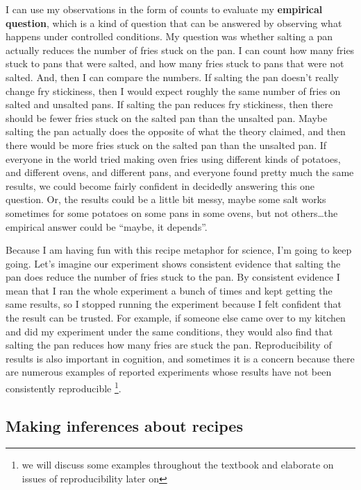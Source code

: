 \documentclass[
  oneside,
  12pt]{crumpbook}
\begin{document}
I can use my observations in the form of counts to evaluate my \textbf{empirical question}, which is a kind of question that can be answered by observing what happens under controlled conditions. My question was whether salting a pan actually reduces the number of fries stuck on the pan. I can count how many fries stuck to pans that were salted, and how many fries stuck to pans that were not salted. And, then I can compare the numbers. If salting the pan doesn't really change fry stickiness, then I would expect roughly the same number of fries on salted and unsalted pans. If salting the pan reduces fry stickiness, then there should be fewer fries stuck on the salted pan than the unsalted pan. Maybe salting the pan actually does the opposite of what the theory claimed, and then there would be more fries stuck on the salted pan than the unsalted pan. If everyone in the world tried making oven fries using different kinds of potatoes, and different ovens, and different pans, and everyone found pretty much the same results, we could become fairly confident in decidedly answering this one question. Or, the results could be a little bit messy, maybe some salt works sometimes for some potatoes on some pans in some ovens, but not others\ldots the empirical answer could be ``maybe, it depends''.

Because I am having fun with this recipe metaphor for science, I'm going to keep going. Let's imagine our experiment shows consistent evidence that salting the pan does reduce the number of fries stuck to the pan. By consistent evidence I mean that I ran the whole experiment a bunch of times and kept getting the same results, so I stopped running the experiment because I felt confident that the result can be trusted. For example, if someone else came over to my kitchen and did my experiment under the same conditions, they would also find that salting the pan reduces how many fries are stuck the pan. Reproducibility of results is also important in cognition, and sometimes it is a concern because there are numerous examples of reported experiments whose results have not been consistently reproducible \footnote{we will discuss some examples throughout the textbook and elaborate on issues of reproducibility later on}.

\hypertarget{making-inferences-about-recipes}{%
\subsection{Making inferences about recipes}\label{making-inferences-about-recipes}}
\end{document}
